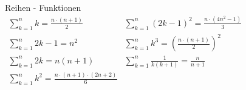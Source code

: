     \begin{definition}{Reihen - Funktionen}\\
        $
        \begin{array}{ll}
            \sum^{n}_{k=1} k = \frac{n \cdot (n+1)}{2} & \sum^{n}_{k=1} (2k - 1)^2 = \frac{n \cdot (4n^2-1)}{3}\\
            \sum^{n}_{k=1} 2k-1 = n^2 & \sum^{n}_{k=1} k^3 = \left( \frac{n \cdot (n+1)}{2}\right)^2\\
            \sum^{n}_{k=1} 2k = n(n+1) & \sum^{n}_{k=1} \frac{1}{k(k+1)} = \frac{n}{n+1}\\
            \sum^{n}_{k=1} k^2 = \frac{n \cdot (n+1) \cdot (2n+2)}{6} &
        \end{array}
        $
    \end{definition}




